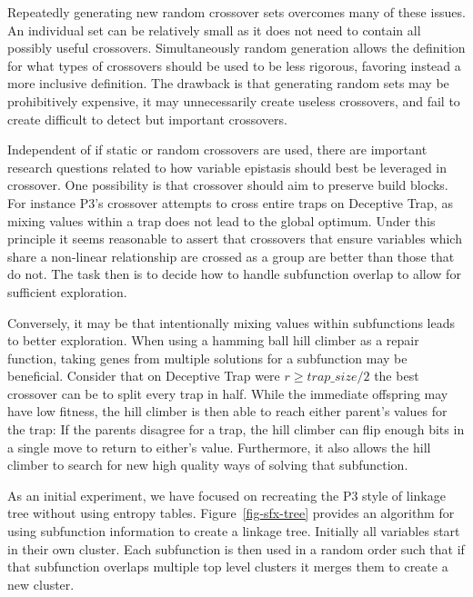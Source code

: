 Repeatedly generating new random crossover sets overcomes many of these issues. An individual set can be relatively small
as it does not need to contain all possibly useful crossovers. Simultaneously random generation allows the definition for
what types of crossovers should be used to be less rigorous, favoring instead a more inclusive definition. The drawback
is that generating random sets may be prohibitively expensive, it may unnecessarily create useless crossovers, and fail
to create difficult to detect but important crossovers.

Independent of if static or random crossovers are used, there are important research questions related to how variable epistasis
should best be leveraged in crossover. One possibility is that crossover should aim to preserve build blocks. For instance P3's
crossover attempts to cross entire traps on Deceptive Trap, as mixing values within a trap does not lead to the global optimum.
Under this principle it seems reasonable to assert that crossovers that ensure variables which share a non-linear relationship
are crossed as a group are better than those that do not. The task then is to decide how to handle subfunction overlap to allow
for sufficient exploration.

Conversely, it may be that intentionally mixing values within subfunctions leads to better exploration. When using a hamming
ball hill climber as a repair function, taking genes from multiple solutions for a subfunction may be beneficial. Consider
that on Deceptive Trap were $r\geq trap\_size/2$ the best crossover can be to split every trap in half. While the immediate
offspring may have low fitness, the hill climber is then able to reach either parent's values for the trap: If the parents
disagree for a trap, the hill climber can flip enough bits in a single move to return to either's value. Furthermore, it
also allows the hill climber to search for new high quality ways of solving that subfunction.

As an initial experiment, we have focused on recreating the P3 style of linkage tree without using entropy tables.
Figure~\ref{fig-sfx-tree} provides an algorithm for using subfunction information to create a linkage tree.
Initially all variables start in their own cluster. Each subfunction is then used in a random order such that
if that subfunction overlaps multiple top level clusters it merges them to create a new cluster.

